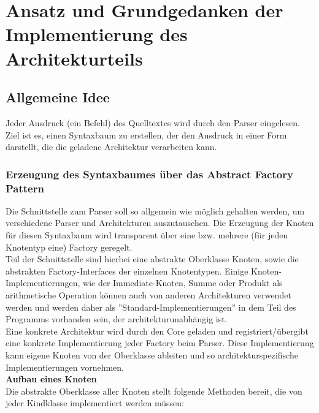 
\section{Ansatz und Grundgedanken der Implementierung des Architekturteils}
\subsection{Allgemeine Idee}
Jeder Ausdruck (ein Befehl) des Quelltextes wird durch den Parser eingelesen. Ziel ist es, einen Syntaxbaum zu erstellen, der den Ausdruck in einer Form darstellt, die die geladene Architektur verarbeiten kann.

\subsubsection{Erzeugung des Syntaxbaumes über das Abstract Factory Pattern}
Die Schnittstelle zum Parser soll so allgemein wie möglich gehalten werden, um verschiedene Parser und Architekturen auszutauschen. Die Erzeugung der Knoten für diesen Syntaxbaum wird transparent über eine bzw. mehrere (für jeden Knotentyp eine) Factory geregelt.\\
Teil der Schnittstelle sind hierbei eine abstrakte Oberklasse Knoten, sowie die abstrakten Factory-Interfaces der einzelnen Knotentypen. Einige Knoten-Implementierungen, wie der Immediate-Knoten, Summe oder Produkt als arithmetische Operation können auch von anderen Architekturen verwendet werden und werden daher als ''Standard-Implementierungen'' in dem Teil des Programms vorhanden sein, der architekturunabhängig ist.\\
Eine konkrete Architektur wird durch den Core geladen und registriert/übergibt eine konkrete Implementierung jeder Factory beim Parser. Diese Implementierung kann eigene Knoten von der Oberklasse ableiten und so architekturspezifische Implementierungen vornehmen.\\
\textbf{Aufbau eines Knoten}\\
Die abstrakte Oberklasse aller Knoten stellt folgende Methoden bereit, die von jeder Kindklasse implementiert werden müssen:
